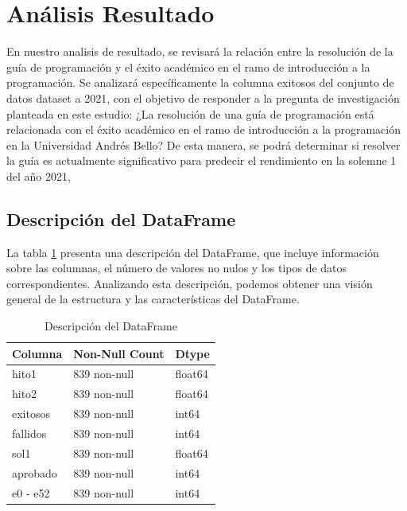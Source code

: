 \hypertarget{analisis_resultado}{%
    \section{Análisis Resultado}\label{Análisis Resultado}}

En nuestro analisis de resultado, se revisará la relación entre la resolución
de la guía de programación y el éxito académico en el ramo de introducción a la
programación. Se analizará específicamente la columna exitosos del conjunto de
datos dataset a 2021, con el objetivo de responder a la pregunta de
investigación planteada en este estudio: ¿La resolución de una guía de
programación está relacionada con el éxito académico en el ramo de introducción
a la programación en la Universidad Andrés Bello? De esta manera, se podrá
determinar si resolver la guía es actualmente significativo para predecir el
rendimiento en la solemne 1 del año 2021,

\subsection{Descripción del DataFrame}

La tabla \ref{tab:descripcion_dataframe} presenta una descripción del DataFrame, que incluye información sobre
las columnas, el número de valores no nulos y los tipos de datos
correspondientes. Analizando esta descripción, podemos obtener una visión
general de la estructura y las características del DataFrame.

\begin{table}[htbp]
    \centering
    \caption{Descripción del DataFrame}
    \begin{tabular}{lll}
        \hline
        \textbf{Columna} & \textbf{Non-Null Count} & \textbf{Dtype} \\
        \hline
        hito1     & 839 non-null    & float64 \\
        hito2     & 839 non-null    & float64 \\
        exitosos  & 839 non-null    & int64   \\
        fallidos  & 839 non-null    & int64   \\
        sol1      & 839 non-null    & float64 \\
        aprobado  & 839 non-null    & int64   \\
        e0 - e52   & 839 non-null    & int64   \\
        \hline
    \end{tabular}
    \label{tab:descripcion_dataframe}
\end{table}

